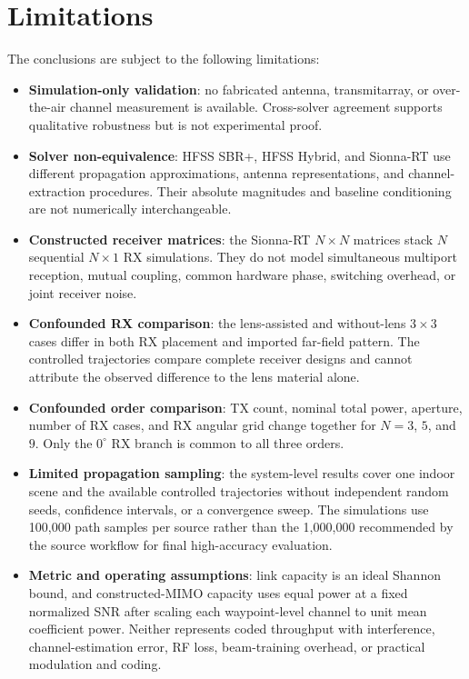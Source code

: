 \section{Limitations}

The conclusions are subject to the following limitations:
\begin{itemize}
    \item \textbf{Simulation-only validation}: no fabricated antenna, transmitarray, or over-the-air channel measurement is available. Cross-solver agreement supports qualitative robustness but is not experimental proof.
    \item \textbf{Solver non-equivalence}: HFSS SBR+, HFSS Hybrid, and Sionna-RT use different propagation approximations, antenna representations, and channel-extraction procedures. Their absolute magnitudes and baseline conditioning are not numerically interchangeable.
    \item \textbf{Constructed receiver matrices}: the Sionna-RT $N\times N$ matrices stack $N$ sequential $N\times1$ RX simulations. They do not model simultaneous multiport reception, mutual coupling, common hardware phase, switching overhead, or joint receiver noise.
    \item \textbf{Confounded RX comparison}: the lens-assisted and without-lens $3\times3$ cases differ in both RX placement and imported far-field pattern. The controlled trajectories compare complete receiver designs and cannot attribute the observed difference to the lens material alone.
    \item \textbf{Confounded order comparison}: TX count, nominal total power, aperture, number of RX cases, and RX angular grid change together for $N=3$, $5$, and $9$. Only the $0^\circ$ RX branch is common to all three orders.
    \item \textbf{Limited propagation sampling}: the system-level results cover one indoor scene and the available controlled trajectories without independent random seeds, confidence intervals, or a convergence sweep. The simulations use 100{,}000 path samples per source rather than the 1{,}000{,}000 recommended by the source workflow for final high-accuracy evaluation.
    \item \textbf{Metric and operating assumptions}: link capacity is an ideal Shannon bound, and constructed-MIMO capacity uses equal power at a fixed normalized SNR after scaling each waypoint-level channel to unit mean coefficient power. Neither represents coded throughput with interference, channel-estimation error, RF loss, beam-training overhead, or practical modulation and coding.

\end{itemize}
